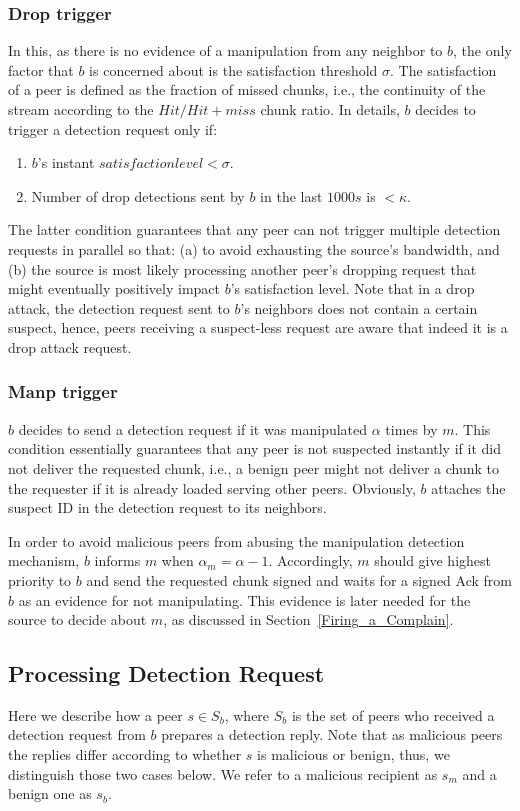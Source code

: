 \subsubsection*{Drop trigger}
In this, as there is no evidence of a manipulation from any neighbor to $b$, the only factor that $b$ is concerned about is the satisfaction threshold $\sigma$.
The satisfaction of a peer is defined as the fraction of missed chunks, i.e., the continuity of the stream according to the $Hit/Hit+miss$ chunk ratio.
In details, $b$ decides to trigger a detection request only if:
\begin{enumerate}
 \item $b$'s instant $satisfaction level < \sigma$.
 \item Number of drop detections sent by $b$ in the last $1000s$ is $< \kappa$.
\end{enumerate}
The latter condition guarantees that any peer can not trigger multiple detection requests in parallel so that: (a) to avoid exhausting the source's bandwidth, and (b) the source is most likely processing another peer's dropping request that might eventually positively impact $b$'s satisfaction level.
Note that in a drop attack, the detection request sent to $b$'s neighbors does not contain a certain suspect, hence, peers receiving a suspect-less request are aware that indeed it is a drop attack request.

\subsubsection*{Manp trigger}
$b$ decides to send a detection request if it was manipulated $\alpha$ times by $m$.
This condition essentially guarantees that any peer is not suspected instantly if it did not deliver the requested chunk, i.e., a benign peer might not deliver a chunk to the requester if it is already loaded serving other peers.
Obviously, $b$ attaches the suspect ID in the detection request to its neighbors.

In order to avoid malicious peers from abusing the manipulation detection mechanism, $b$ informs $m$ when $\alpha_m = \alpha -1$.
Accordingly, $m$ should give highest priority to $b$ and send the requested chunk signed and waits for a signed Ack from $b$ as an evidence for not manipulating.
This evidence is later needed for the source to decide about $m$, as discussed in Section~\ref{Firing_a_Complain}.

\subsection{Processing Detection Request}
Here we describe how a peer $s \in S_b$, where $S_b$ is the set of peers who received a detection request from $b$ prepares a detection reply.
Note that as malicious peers the replies differ according to whether $s$ is malicious or benign, thus, we distinguish those two cases below. We refer to a malicious recipient as $s_m$ and a benign one as $s_b$.

